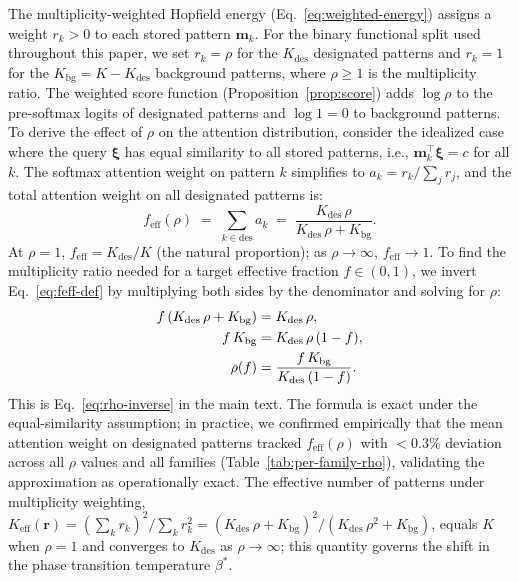 The multiplicity-weighted Hopfield energy (Eq.~\ref{eq:weighted-energy})
assigns a weight $r_k > 0$ to each stored pattern $\mathbf{m}_k$. For the
binary functional split used throughout this paper, we set $r_k = \rho$ for
the $K_{\mathrm{des}}$ designated patterns and $r_k = 1$ for the
$K_{\mathrm{bg}} = K - K_{\mathrm{des}}$ background patterns, where
$\rho \geq 1$ is the multiplicity ratio. The weighted score function
(Proposition~\ref{prop:score}) adds $\log\rho$ to the pre-softmax logits of
designated patterns and $\log 1 = 0$ to background patterns. To derive the
effect of $\rho$ on the attention distribution, consider the idealized case
where the query $\boldsymbol{\xi}$ has equal similarity to all stored
patterns, i.e., $\mathbf{m}_k^\top\boldsymbol{\xi} = c$ for all $k$. The
softmax attention weight on pattern $k$ simplifies to
$a_k = r_k / \sum_{j} r_j$, and the total attention weight on all designated
patterns is:
\begin{equation}\label{eq:feff-def}
  f_{\mathrm{eff}}(\rho)
  \;=\; \sum_{k \in \mathrm{des}} a_k
  \;=\; \frac{K_{\mathrm{des}}\,\rho}{K_{\mathrm{des}}\,\rho + K_{\mathrm{bg}}}.
\end{equation}
At $\rho = 1$, $f_{\mathrm{eff}} = K_{\mathrm{des}} / K$ (the natural
proportion); as $\rho \to \infty$, $f_{\mathrm{eff}} \to 1$. To find the
multiplicity ratio needed for a target effective fraction $f \in (0, 1)$, we
invert Eq.~\eqref{eq:feff-def} by multiplying both sides by the denominator
and solving for $\rho$:
\begin{align}
  f\,(K_{\mathrm{des}}\,\rho + K_{\mathrm{bg}}) &= K_{\mathrm{des}}\,\rho,
  \notag\\
  f\,K_{\mathrm{bg}} &= K_{\mathrm{des}}\,\rho\,(1 - f), \notag\\
  \rho(f) &= \frac{f\,K_{\mathrm{bg}}}{K_{\mathrm{des}}\,(1-f)}.
  \label{eq:rho-inverse-derived}
\end{align}
This is Eq.~\eqref{eq:rho-inverse} in the main text. The formula is exact
under the equal-similarity assumption; in practice, we confirmed empirically
that the mean attention weight on designated patterns tracked
$f_{\mathrm{eff}}(\rho)$ with $< 0.3\%$ deviation across all $\rho$ values
and all families (Table~\ref{tab:per-family-rho}), validating the
approximation as operationally exact. The effective number of patterns under
multiplicity weighting,
$K_{\mathrm{eff}}(\mathbf{r}) = (\sum_k r_k)^2 / \sum_k r_k^2
= (K_{\mathrm{des}}\,\rho + K_{\mathrm{bg}})^2 /
(K_{\mathrm{des}}\,\rho^2 + K_{\mathrm{bg}})$, equals $K$ when $\rho = 1$
and converges to $K_{\mathrm{des}}$ as $\rho \to \infty$; this quantity
governs the shift in the phase transition temperature $\beta^{*}$.

